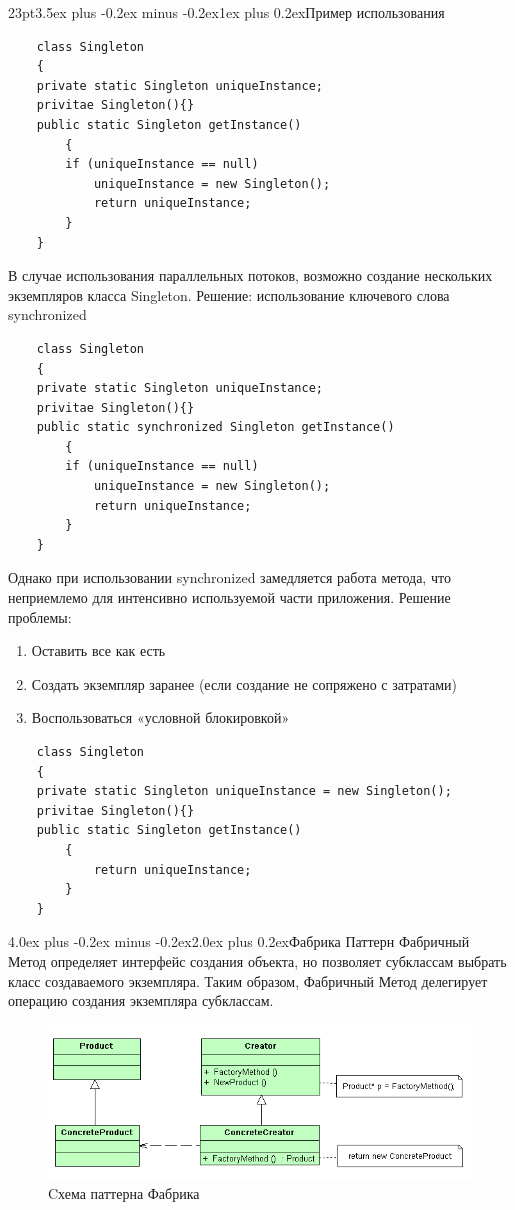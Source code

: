 \documentclass[12pt, a4paper]{book}%
\makeatletter
\renewcommand{\section}{\@startsection{section}{1}{1pt}%
{4.0ex plus -0.2ex minus -0.2ex}{2.0ex plus 0.2ex}{\centering\bf}}%
\renewcommand{\subsection}{\@startsection{subsection}{2}%
{23pt}{3.5ex plus -0.2ex minus -0.2ex}{1ex plus 0.2ex}{\bf}}%
\makeatother
\begin{document}
{\subsection{Пример использования}
\begin{lstlisting}
    class Singleton
    {
    private static Singleton uniqueInstance;
    privitae Singleton(){}
    public static Singleton getInstance()
        {
        if (uniqueInstance == null)
            uniqueInstance = new Singleton();
            return uniqueInstance;
        }
    }
\end{lstlisting}
В случае использования параллельных потоков, возможно создание нескольких экземпляров класса Singleton.
Решение: использование ключевого слова synchronized
\begin{lstlisting}
    class Singleton
    {
    private static Singleton uniqueInstance;
    privitae Singleton(){}
    public static synchronized Singleton getInstance()
        {
        if (uniqueInstance == null)
            uniqueInstance = new Singleton();
            return uniqueInstance;
        }
    }
\end{lstlisting}
Однако при использовании synchronized замедляется работа метода, что неприемлемо для интенсивно используемой части приложения.
Решение проблемы:
\begin{enumerate}
\item Оставить все как есть
\item Создать экземпляр заранее (если создание не сопряжено с затратами)
\item Воспользоваться «условной блокировкой»
\end{enumerate}
\begin{lstlisting}
    class Singleton
    {
    private static Singleton uniqueInstance = new Singleton();
    privitae Singleton(){}
    public static Singleton getInstance()
        {
            return uniqueInstance;
        }
    }
\end{lstlisting}

\section{Фабрика}
Паттерн Фабричный Метод определяет интерфейс создания объекта, но позволяет субклассам выбрать класс создаваемого экземпляра. Таким образом, Фабричный Метод делегирует операцию создания экземпляра субклассам.
\begin{figure}[!ht]
\begin{center}
\includegraphics[scale=0.7]{images/pic/pic26-2.png}\caption{Cхема паттерна Фабрика}\label{figure1}
\end{center}
\end{figure}
}
\end{document}
